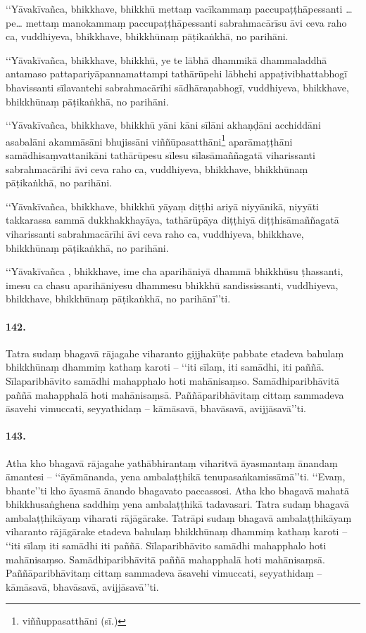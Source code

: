 ‘‘Yāvakīvañca, bhikkhave, bhikkhū mettaṃ vacīkammaṃ paccupaṭṭhāpessanti …pe… mettaṃ manokammaṃ paccupaṭṭhāpessanti sabrahmacārīsu āvi ceva raho ca, vuddhiyeva, bhikkhave, bhikkhūnaṃ pāṭikaṅkhā, no parihāni.

‘‘Yāvakīvañca, bhikkhave, bhikkhū, ye te lābhā dhammikā dhammaladdhā antamaso pattapariyāpannamattampi tathārūpehi lābhehi appaṭivibhattabhogī bhavissanti sīlavantehi sabrahmacārīhi sādhāraṇabhogī, vuddhiyeva, bhikkhave, bhikkhūnaṃ pāṭikaṅkhā, no parihāni.

‘‘Yāvakīvañca, bhikkhave, bhikkhū yāni kāni sīlāni akhaṇḍāni acchiddāni asabalāni akammāsāni bhujissāni viññūpasatthāni\footnote{viññuppasatthāni (sī.)} aparāmaṭṭhāni samādhisaṃvattanikāni tathārūpesu sīlesu sīlasāmaññagatā viharissanti sabrahmacārīhi āvi ceva raho ca, vuddhiyeva, bhikkhave, bhikkhūnaṃ pāṭikaṅkhā, no parihāni.

‘‘Yāvakīvañca, bhikkhave, bhikkhū yāyaṃ diṭṭhi ariyā niyyānikā, niyyāti takkarassa sammā dukkhakkhayāya, tathārūpāya diṭṭhiyā diṭṭhisāmaññagatā viharissanti sabrahmacārīhi āvi ceva raho ca, vuddhiyeva, bhikkhave, bhikkhūnaṃ pāṭikaṅkhā, no parihāni.

‘‘Yāvakīvañca , bhikkhave, ime cha aparihāniyā dhammā bhikkhūsu ṭhassanti, imesu ca chasu aparihāniyesu dhammesu bhikkhū sandississanti, vuddhiyeva, bhikkhave, bhikkhūnaṃ pāṭikaṅkhā, no parihānī’’ti.

\paragraph{142.} Tatra sudaṃ bhagavā rājagahe viharanto gijjhakūṭe pabbate etadeva bahulaṃ bhikkhūnaṃ dhammiṃ kathaṃ karoti – ‘‘iti sīlaṃ, iti samādhi, iti paññā. Sīlaparibhāvito samādhi mahapphalo hoti mahānisaṃso. Samādhiparibhāvitā paññā mahapphalā hoti mahānisaṃsā. Paññāparibhāvitaṃ cittaṃ sammadeva āsavehi vimuccati, seyyathidaṃ – kāmāsavā, bhavāsavā, avijjāsavā’’ti.

\paragraph{143.} Atha kho bhagavā rājagahe yathābhirantaṃ viharitvā āyasmantaṃ ānandaṃ āmantesi – ‘‘āyāmānanda, yena ambalaṭṭhikā tenupasaṅkamissāmā’’ti. ‘‘Evaṃ, bhante’’ti kho āyasmā ānando bhagavato paccassosi. Atha kho bhagavā mahatā bhikkhusaṅghena saddhiṃ yena ambalaṭṭhikā tadavasari. Tatra sudaṃ bhagavā ambalaṭṭhikāyaṃ viharati rājāgārake. Tatrāpi sudaṃ bhagavā ambalaṭṭhikāyaṃ viharanto rājāgārake etadeva bahulaṃ bhikkhūnaṃ dhammiṃ kathaṃ karoti – ‘‘iti sīlaṃ iti samādhi iti paññā. Sīlaparibhāvito samādhi mahapphalo hoti mahānisaṃso. Samādhiparibhāvitā paññā mahapphalā hoti mahānisaṃsā. Paññāparibhāvitaṃ cittaṃ sammadeva āsavehi vimuccati, seyyathidaṃ – kāmāsavā, bhavāsavā, avijjāsavā’’ti.

